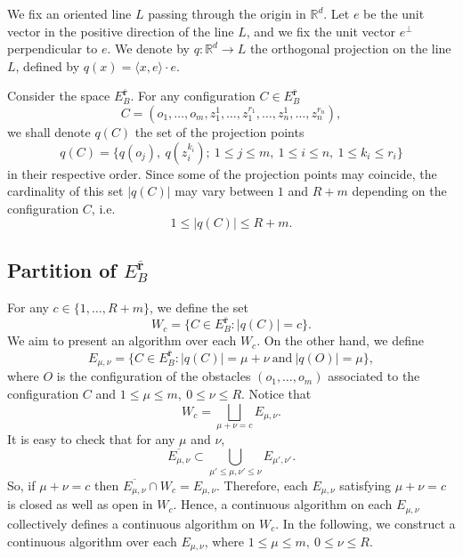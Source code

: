 \documentclass[12pt,oneside,reqno]{amsart}
\theoremstyle{plain}
\theoremstyle{definition}
\theoremstyle{remark}
\newcommand{\rr}{{\mathbb {R}}}
\newcommand{\br}{\bar{\mathbf{r}}}
\begin{document}
We fix an oriented line $L$ passing through the origin in $\rr^d$. Let $e$ be the unit vector in the positive direction of the line $L$, and we fix the unit vector $e^{\perp}$ perpendicular to $e$. We denote by $q: \rr^d \to L$ the orthogonal projection on the line $L$, defined by $q(x)=\langle  x, e \rangle  \cdot  e$.


Consider the space $E^{\bar{\textbf{r}}}_B$. For any configuration $C\in E^{\bar{\textbf{r}}}_B$
\begin{equation*}%
C=(o_1, \ldots, o_m, z^1_{1}, \ldots , z^{r_{1}}_{1}, \ldots, z^1_{n}, \ldots , z^{r_{n}}_{n} ),
\end{equation*} 
we shall denote $q(C)$ the set of the projection points $$q(C) = \{q(o_j), ~q(z_i^{k_i}); ~1\leq j \leq m,~ 1\leq i \leq n, ~ 1\leq k_i \leq r_i\}$$ in their respective order.
Since some of the projection points may coincide, the cardinality of this set $ |q(C)|$ may vary between $1$ and $R + m$ depending on the configuration $C$, i.e. $$1\leq |q(C)|\leq R + m.$$


\subsection{Partition of \texorpdfstring{$E^{\br}_B$}:}

For any $c \in \{1,\dots,R + m\}$, we define the set $$W_c=\big \{ C \in E^{\bar{\textbf{r}}}_B \colon |q(C)| = c\}.$$
We aim to present an algorithm over each $W_c$. On the other hand, we define $$E_{\mu,\nu}= \big\{C\in E^{\bar{\textbf{r}}}_B : |q(C)| = \mu+\nu ~\text{and}~ |q(O)| =\mu \big\},$$ where $O$ is the configuration of the obstacles $(o_1, \dots, o_m)$ associated to the configuration $C$ and $1\leq \mu \leq m,~ 0\leq \nu \leq R$. Notice that $$W_c=\bigsqcup_{\mu+\nu=c}E_{\mu,\nu}.$$
It is easy to check that for any $\mu$ and $\nu$, $$\overline{E_{\mu,\nu}}\subset \bigcup_{\mu'\leq \mu, \nu'\leq \nu}E_{\mu', \nu'}.$$ So, if $\mu+\nu=c$ then $\overline{E_{\mu, \nu}}\cap W_c=E_{\mu, \nu}$. Therefore, each $E_{\mu, \nu}$ satisfying $\mu+\nu=c$ is closed as well as open in $W_c$. Hence, a continuous algorithm on each $E_{\mu,\nu}$ collectively defines a continuous algorithm on $W_c$. In the following, we construct a continuous algorithm over each $E_{\mu,\nu}$, where $ 1\leq \mu \leq m,~ 0\leq \nu \leq R$. 
\end{document}
